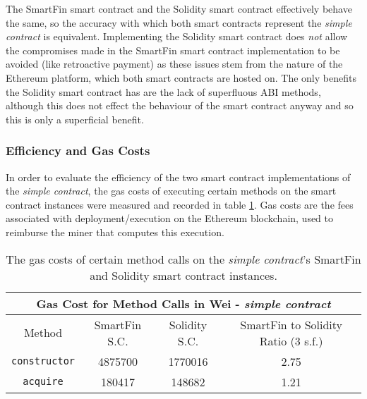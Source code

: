 The SmartFin smart contract and the Solidity smart contract effectively behave the same, so the accuracy with which both smart contracts represent the \textit{simple contract} is equivalent. Implementing the Solidity smart contract does \textit{not} allow the compromises made in the SmartFin smart contract implementation to be avoided (like retroactive payment) as these issues stem from the nature of the Ethereum platform, which both smart contracts are hosted on. The only benefits the Solidity smart contract has are the lack of superfluous ABI methods, although this does not effect the behaviour of the smart contract anyway and so this is only a superficial benefit.


\subsubsection{Efficiency and Gas Costs}

In order to evaluate the efficiency of the two smart contract implementations of the \textit{simple contract}, the gas costs of executing certain methods on the smart contract instances were measured and recorded in table \ref{table:gas-cost-simple}. Gas costs are the fees associated with deployment/execution on the Ethereum blockchain, used to reimburse the miner that computes this execution. \\

\begin{table}[h!]
    \centering
    \begin{tabular}{ |c|c|c|c| } 
        \hline
        \multicolumn{4}{|c|}{Gas Cost for Method Calls in Wei - \textit{simple contract}} \\
        \hline
        Method & SmartFin S.C. & Solidity S.C. & SmartFin to Solidity Ratio (3 s.f.) \\
        \hline
        \texttt{constructor} & 4875700 & 1770016 & 2.75 \\ 
        \hline
        \texttt{acquire} & 180417 & 148682 & 1.21 \\ 
        \hline
    \end{tabular}
    \caption{The gas costs of certain method calls on the \textit{simple contract}'s SmartFin and Solidity smart contract instances.}
    \label{table:gas-cost-simple}
\end{table}

